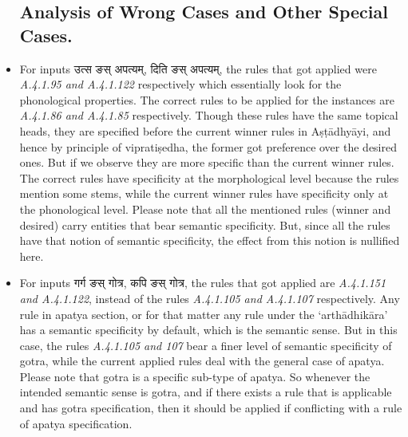 \documentclass[11pt]{article}
\begin{document}
\begin{itemize}

\subsection{Analysis of Wrong Cases and Other Special Cases.}
\label{wrongCases}

\item For inputs {\skt उत्स ङस् अपत्यम्, दिति ङस् अपत्यम्}, the rules that got applied were {\sl A.4.1.95 and \sl A.4.1.122} respectively which essentially look for the phonological properties. The correct rules to be applied for the instances are {\sl A.4.1.86 and A.4.1.85} respectively. Though these rules have the same topical heads, they are specified before the current winner rules in Aṣṭādhyāyi, and hence by principle of vipratiṣedha, the former got preference over the desired ones. But if we observe they are more specific than the current winner rules. The correct rules have specificity at the morphological level because the rules mention some stems, while the current winner rules have specificity only at the phonological level. Please note that all the mentioned rules (winner and desired) carry entities that bear semantic specificity. But, since all the rules have that notion of semantic specificity, the effect from this notion is nullified here.

\item For inputs {\skt गर्ग ङस् गोत्र, कपि ङस् गोत्र}, the rules that got applied are {\sl A.4.1.151 and A.4.1.122}, instead of the rules {\sl A.4.1.105 and A.4.1.107} respectively. Any rule in apatya section, or for that matter any rule under the `arthādhikāra' has a semantic specificity by default, which is the semantic sense. But in this case, the rules {\sl A.4.1.105 and 107} bear a finer level of semantic specificity of gotra, while the current applied rules deal with the  general case of apatya. Please note that gotra is a specific sub-type of apatya. So whenever the intended semantic sense is gotra, and if there exists a rule that is applicable and has gotra specification, then it should be applied if conflicting with a rule of apatya specification.


\end{itemize}
\end{document}
